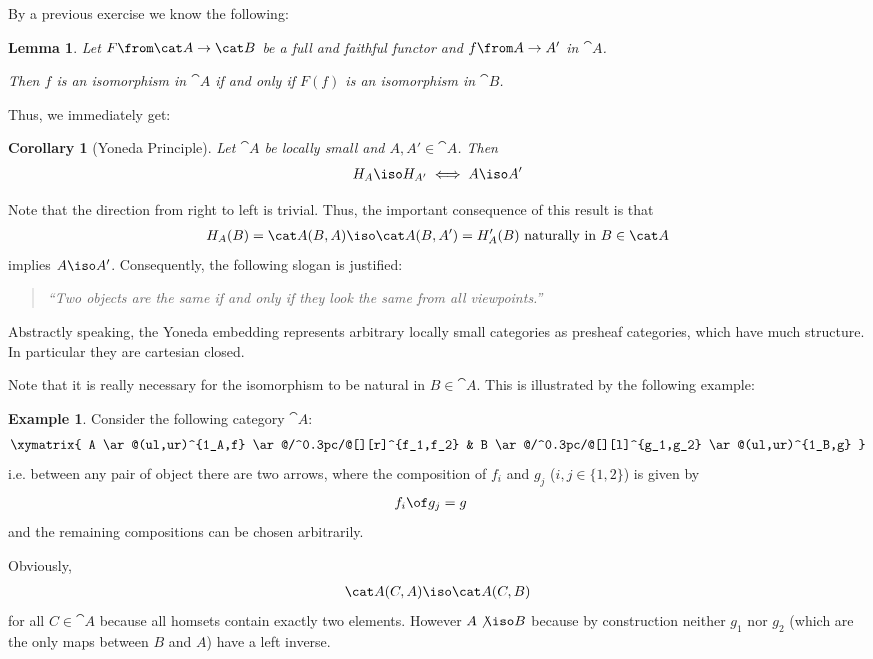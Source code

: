 \documentclass{article}
\newtheorem{lemma}{Lemma}
\newtheorem{corollary}{Corollary}
\theoremstyle{definition}
\newtheorem{example}{Example}
\numberwithin{equation}{section}
\begin{document}
By a previous exercise we know the following:
\begin{lemma}
  \label{lem:ff}
  Let $F\from\cat A\to\cat B$ be a full and faithful functor and $f\from A\to A'$ in $\cat A$.

  Then $f$ is an isomorphism in $\cat A$ if and only if $F(f)$ is an isomorphism in $\cat B$.
\end{lemma}
Thus, we immediately get:
\begin{corollary}[Yoneda Principle]
  Let $\cat A$ be locally small and $A,A'\in\cat A$. Then
  \begin{align*}
    H_A\iso H_{A'} \iff A\iso A'
  \end{align*}
\end{corollary}
Note that the direction from right to left is trivial. Thus, the important consequence of this result is that
\begin{align*}
  H_A(B)=\cat A(B,A)\iso \cat  A(B,A')=H_A'(B) \text{ naturally in } B\in\cat A
\end{align*}
implies $A\iso A'$. Consequently, the following slogan is justified:
\begin{quote}
  \textit{``Two objects are the same if and only if they look the same from all viewpoints.''}
\end{quote}
Abstractly speaking, the Yoneda embedding represents arbitrary locally small categories as presheaf categories, which have much structure. In particular they are cartesian closed.

Note that it is really necessary for the isomorphism to be natural in $B\in\cat A$. This is illustrated by the following example:
\begin{example}
  Consider the following category $\cat A$: 
\begin{align*}
  \xymatrix{
  A \ar@(ul,ur)^{1_A,f} \ar@/^0.3pc/@[][r]^{f_1,f_2} & B \ar@/^0.3pc/@[][l]^{g_1,g_2} \ar@(ul,ur)^{1_B,g}
                                                       } 
  \end{align*}
  i.e. between any pair of object there are two arrows, where the composition of $f_i$ and $g_j$ ($i,j\in\{1,2\}$) is given by
  \begin{align*}
    f_i\of g_j&=g
  \end{align*}
  and the remaining compositions can be chosen arbitrarily.
  
  Obviously,
  \begin{align*}
    \cat A(C,A)\iso\cat A(C,B)
  \end{align*}
  for all $C\in\cat A$ because all homsets contain exactly two elements. However $A\not\iso B$ because by construction neither $g_1$ nor $g_2$ (which are the only maps between $B$ and $A$) have a left inverse.
\end{example}
\end{document}
